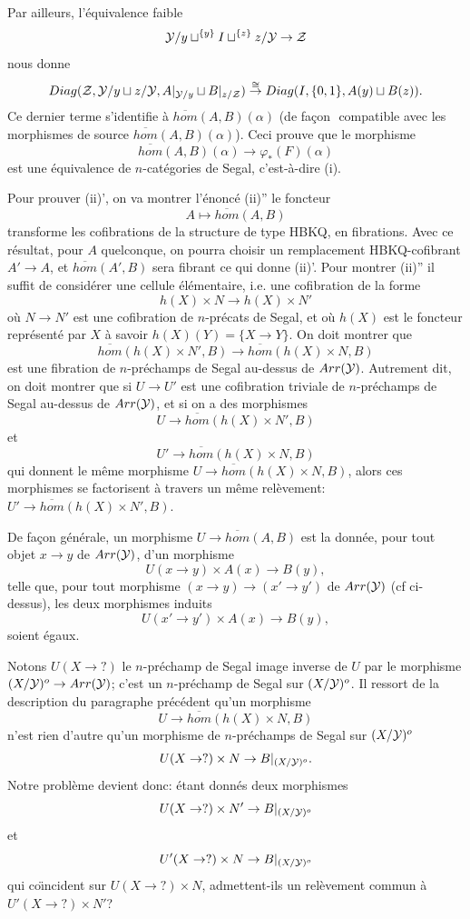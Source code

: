 \documentclass[12pt]{article}
\newcommand{\Yy}{{\cal Y}}
\newcommand{\Zz}{{\cal Z}}
\newcommand{\facon}{fa\c{c}on\,\, }
\begin{document}
Par ailleurs, l'\'equivalence faible
$$
\Yy /y \sqcup ^{\{ y\} } I \sqcup ^{\{ z \} } z/\Yy \rightarrow \Zz
$$
nous donne
$$
Diag (\Zz ,\Yy /y \sqcup z/\Yy, A|_{\Yy /y}\sqcup B|_{z/\Zz})
\stackrel{\cong}{\rightarrow}
Diag(I, \{ 0,1\} , A(y)\sqcup B(z)).
$$
Ce dernier terme s'identifie \`a $\overline{hom}(A,B)(\alpha )$ (de
\facon
compatible avec les morphismes de source $\overline{hom}(A,B)(\alpha
)$).
Ceci prouve que le morphisme
$$
\overline{hom}(A,B)(\alpha )\rightarrow
\varphi _{\ast}(F)(\alpha )
$$
est une \'equivalence de $n$-cat\'egories de Segal, c'est-\`a-dire (i).

Pour prouver (ii)', on va montrer l'\'enonc\'e
\newline
(ii)'' le foncteur
$$
A\mapsto \overline{hom}(A,B)
$$
transforme les cofibrations de la structure de type
HBKQ, en fibrations.
\newline
Avec ce r\'esultat, pour $A$ quelconque,
on pourra choisir un remplacement HBKQ-cofibrant
$A'\rightarrow A$, et $\overline{hom}(A',B)$ sera fibrant ce
qui donne (ii)'. Pour montrer (ii)'' il suffit de consid\'erer une cellule
\'el\'ementaire, i.e. une cofibration de la forme
$$
h(X) \times N \rightarrow h(X) \times N'
$$
o\`u $N\rightarrow N'$ est une cofibration de $n$-pr\'ecats de Segal, et
o\`u $h(X)$ est le foncteur repr\'esent\'e par $X$ \`a savoir
$h(X)(Y)=\{ X\rightarrow Y\}$. On doit montrer que
$$
\overline{hom}( h(X) \times N',B)\rightarrow
\overline{hom}( h(X) \times N,B)
$$
est une fibration de $n$-pr\'echamps de Segal au-dessus de $Arr(\Yy )$.
Autrement dit, on doit montrer que si $U\rightarrow U'$ est une cofibration
triviale de $n$-pr\'echamps de Segal au-dessus de $Arr(\Yy )$,
et si on a des morphismes
$$
U\rightarrow \overline{hom}( h(X) \times N',B)
$$
et
$$
U'\rightarrow \overline{hom}( h(X) \times N,B)
$$
qui donnent le m\^eme morphisme
$U\rightarrow \overline{hom}( h(X) \times N,B)$, alors ces morphismes
se factorisent \`a travers
un m\^eme rel\`evement: $U'\rightarrow \overline{hom}( h(X) \times N',B)$.

De fa\c{c}on g\'en\'erale, un morphisme
$U\rightarrow \overline{hom}(A,B)$ est la donn\'ee,
pour tout objet $x\rightarrow y$ de $Arr (\Yy )$, d'un morphisme
$$
U(x\rightarrow y)\times A(x) \rightarrow B(y),
$$
telle que, pour tout morphisme
$(x\rightarrow y)\rightarrow (x'\rightarrow y')$ de $Arr (\Yy
)$ (cf ci-dessus), les deux morphismes induits
$$
U(x'\rightarrow y')\times A(x) \rightarrow B(y),
$$
soient \'egaux.

Notons $U(X\rightarrow ?)$ le $n$-pr\'echamp de Segal image inverse de $U$ par
le morphisme $(X/\Yy )^o \rightarrow Arr (\Yy )$; c'est un $n$-pr\'echamp de
Segal sur $(X/\Yy )^o$. Il ressort de la description du paragraphe
pr\'ec\'edent qu'un morphisme
$$
U\rightarrow \overline{hom}( h(X) \times N,B)
$$
n'est rien d'autre qu'un morphisme de $n$-pr\'echamps de Segal sur
$(X/\Yy )^o$
$$
U(X\rightarrow ?)\times N \rightarrow B|_{(X/\Yy )^o}.
$$
Notre probl\`eme devient donc: \'etant donn\'es deux morphismes
$$
U(X\rightarrow ?)\times N' \rightarrow B|_{(X/\Yy )^o}
$$
et
$$
U'(X\rightarrow ?)\times N \rightarrow B|_{(X/\Yy )^o}
$$
qui co\"{\i}ncident sur $U(X\rightarrow ?)\times N$,
admettent-ils un rel\`evement commun
\`a $U'(X\rightarrow ?)\times N'$?
\end{document}
